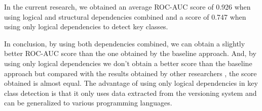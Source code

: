\documentclass[runningheads]{comsis2}
\begin{document}
In the current research, we obtained an average ROC-AUC score of 0.926 when using logical and structural dependencies combined and a score of 0.747 when using only logical dependencies to detect key classes.

In conclusion, by using both dependencies combined, we can obtain a slightly better ROC-AUC score than the one obtained by the baseline approach. And, by using only logical dependencies we don't obtain a better score than the baseline approach but compared with the results obtained by other researchers \cite{6676885}, the score obtained is almost equal. The advantage of using only logical dependencies in key class detection is that it only uses data extracted from the versioning system and can be generalized to various programming languages.









%
%

\end{document}
